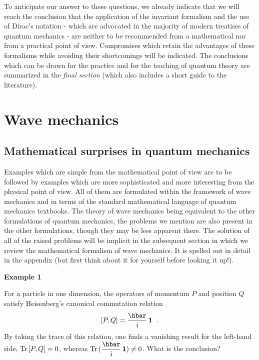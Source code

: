 \documentclass[12pt]{report}
\def\underline{\relax}
\begin{document}
To anticipate our answer to these questions, we already indicate
that we
will reach the conclusion that the 
{\underline{\em systematic}} application
of the invariant formalism and the {\underline{\em rigid}} 
use of Dirac's
notation - which are advocated in the majority of modern treatises
of quantum mechanics -
are neither to be recommended from a mathematical nor
from a practical point of view.
Compromises which retain the advantages of these
formalisms while avoiding their shortcomings will be
indicated. The conclusions which can be drawn for the 
practice and for the teaching of quantum theory 
are summarized in the {\em final section} 
(which also includes a short guide to the literature). 



\chapter{Wave mechanics}

\section{Mathematical surprises in quantum mechanics}


Examples which are simple from the mathematical point of view
are to be followed by examples which are more sophisticated 
and more interesting from the physical point of view.
 All of them are formulated within the framework
of wave mechanics and in terms of the standard mathematical language of quantum
mechanics textbooks.
The theory of wave mechanics being equivalent to the
other formulations of quantum mechanics, the 
problems we mention 
are also present in the other formulations,
though they may be less apparent there.
The solution of all of the raised problems will be implicit
in the subsequent  
section in which we review the mathematical formalism 
of wave mechanics. It is spelled out in detail
in the appendix
(but first think about it for yourself before looking 
it up!). 
 
 
 
 
\bigskip
 
\noindent 
{\bf Example 1}
 
\medskip
 
For a particle in one dimension, the operators of
momentum $P$ and position $Q$ satisfy Heisenberg's canonical
commutation relation
\begin{equation}
\label{hei} 
[ P, Q ] = \ds{\hbar \over \ri} \, {\bf 1}
\ \ .
\end{equation}
By taking the trace of this relation, one finds a vanishing
result for the left-hand side,
${\rm Tr} \, [P,Q]=0$, whereas
${\rm Tr} \,
( \ds{\hbar \over \ri} \, {\bf 1} ) \neq 0$. What is the conclusion?
 
\end{document}
